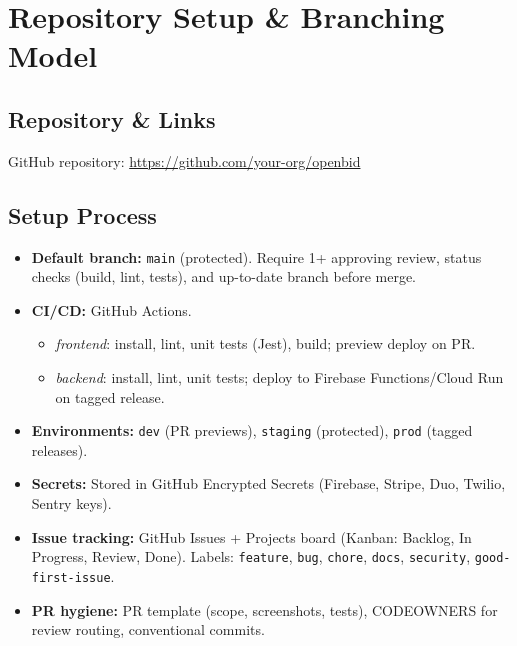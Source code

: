 \documentclass[11pt]{article}
\newcommand{\repoURL}{https://github.com/your-org/openbid}
\begin{document}
\section{Repository Setup \& Branching Model}

\subsection*{Repository \& Links}
GitHub repository: \href{\repoURL}{\repoURL}

\subsection*{Setup Process}
\begin{itemize}[leftmargin=1.4em]
  \item \textbf{Default branch:} \texttt{main} (protected). Require 1+ approving review, status checks (build, lint, tests), and up-to-date branch before merge.
  \item \textbf{CI/CD:} GitHub Actions.
    \begin{itemize}
      \item \emph{frontend}: install, lint, unit tests (Jest), build; preview deploy on PR.
      \item \emph{backend}: install, lint, unit tests; deploy to Firebase Functions/Cloud Run on tagged release.
    \end{itemize}
  \item \textbf{Environments:} \texttt{dev} (PR previews), \texttt{staging} (protected), \texttt{prod} (tagged releases).
  \item \textbf{Secrets:} Stored in GitHub Encrypted Secrets (Firebase, Stripe, Duo, Twilio, Sentry keys).
  \item \textbf{Issue tracking:} GitHub Issues + Projects board (Kanban: Backlog, In Progress, Review, Done). Labels: \texttt{feature}, \texttt{bug}, \texttt{chore}, \texttt{docs}, \texttt{security}, \texttt{good-first-issue}.
  \item \textbf{PR hygiene:} PR template (scope, screenshots, tests), CODEOWNERS for review routing, conventional commits.
\end{itemize}
\end{document}

